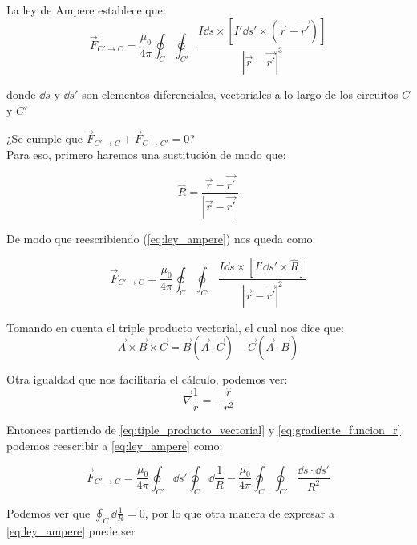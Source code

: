 \documentclass[11pt]{report}
\theoremstyle{plain}
\theoremstyle{definition}
\begin{document}
La ley de Ampere establece que:
\begin{equation}
	\vec{F}_{C' \rightarrow C} = \frac{\mu_0}{4\pi}
 \oint_C \oint_{C'} \frac{I \dd{s}\times[I' \dd{s'}\times (\vec{r}-\vec{r'})]}{|\vec{r}-\vec{r'}|^3}
 \label{eq:ley_ampere}
\end{equation}


donde $\dd{s}$ y $\dd{s'}$ son elementos diferenciales, vectoriales a lo largo de los circuitos $C$ y $C'$


¿Se cumple que $\vec{F}_{C' \rightarrow C} + \vec{F}_{C \rightarrow C'} = 0$?\\

Para eso, primero haremos una sustitución de modo que:

\begin{equation*} %
	\hat{R} = \frac{\vec{r}-\vec{r'}}{|\vec{r}-\vec{r'}|}
\end{equation*}

De modo que reescribiendo (\ref{eq:ley_ampere}) nos queda como:


\begin{equation*} %
	\vec{F}_{C' \rightarrow C} = \frac{\mu_0}{4\pi}
 \oint_C \oint_{C'} \frac{I \dd{s}\times[I' \dd{s'}\times \hat{R}]}{|\vec{r}-\vec{r'}|^2}
\end{equation*}


Tomando en cuenta el triple producto vectorial, el cual nos dice que:
\begin{equation} %
	\vec{A}\times\vec{B}\times\vec{C}=\vec{B}(\vec{A}\cdot \vec{C})-\vec{C}(\vec{A}\cdot \vec{B})
	\label{eq:tiple_producto_vectorial}
\end{equation}

Otra igualdad que nos facilitaría el cálculo, podemos ver:
\begin{equation}
	\vec{\nabla}\frac{1}{r}=-\frac{\hat{r}}{r^2}
	\label{eq:gradiente_funcion_r}
\end{equation}

Entonces partiendo de \ref{eq:tiple_producto_vectorial} y \ref{eq:gradiente_funcion_r} podemos reescribir a \ref{eq:ley_ampere} como:

\begin{equation*}
	\vec{F}_{C' \rightarrow C} = \frac{\mu_0}{4\pi} \oint_{C'} \dd{s'} \oint_C \dd{\frac{1}{R}} - \frac{\mu_0}{4\pi}\oint_C \oint_{C'} \frac{\dd{s} \cdot \dd{s'}}{R^2}
\end{equation*}

Podemos ver que $\oint_C \dd{\frac{1}{R}} = 0$, por lo que otra manera de expresar a \ref{eq:ley_ampere} puede ser 
\end{document}
